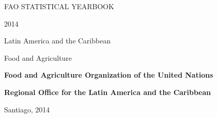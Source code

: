 \onecolumn

\vspace*{100pt}
\begin{center}
\Huge{FAO STATISTICAL YEARBOOK}

\Huge{2014}

\Huge{Latin America and the Caribbean}

\Huge{Food and Agriculture}

\end{center}


\vspace*{200pt}
\begin{center}
\textbf{\LARGE{Food and Agriculture Organization of the United Nations}}

\textbf{\LARGE{Regional Office for the Latin America and the Caribbean}}

\LARGE{Santiago, 2014}
\end{center}

\newpage
